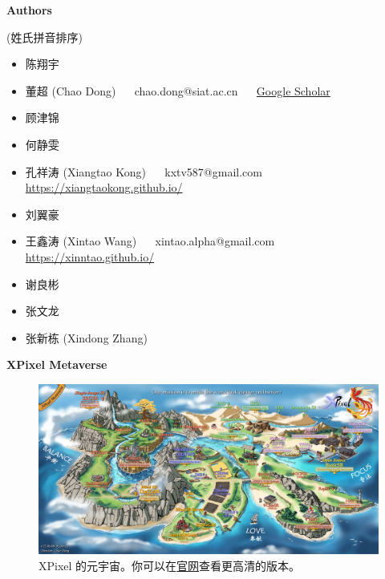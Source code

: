 \documentclass[../main.tex]{subfiles}
\begin{document}
\newpage

{\Large\textbf{Authors}}

(姓氏拼音排序)

\begin{itemize}
	\item 陈翔宇
	\item 董超 (Chao Dong) ~~ chao.dong@siat.ac.cn ~~ \href{https://scholar.google.com.hk/citations?user=OSDCB0UAAAAJ}{Google Scholar}
	\item 顾津锦
	\item 何静雯
	\item 孔祥涛 (Xiangtao Kong) ~~ kxtv587@gmail.com ~~ \url{https://xiangtaokong.github.io/}
	\item 刘翼豪
	\item 王鑫涛 (Xintao Wang) ~~ xintao.alpha@gmail.com ~~ \url{https://xinntao.github.io/}
	\item 谢良彬
	\item 张文龙
	\item 张新栋 (Xindong Zhang)
\end{itemize}

\newpage
{\Large\textbf{ XPixel Metaverse}}

\begin{figure}[h]
	\vspace{1cm}
	\begin{center}
		\includegraphics[width=\linewidth]{figures/XPixelMetaverse_small.jpg}
		\caption{XPixel 的元宇宙。你可以在\href{https://xpixel.group/2022/06/06/poster.html}{官网}查看更高清的版本。}
	\end{center}
\end{figure}
\end{document}
